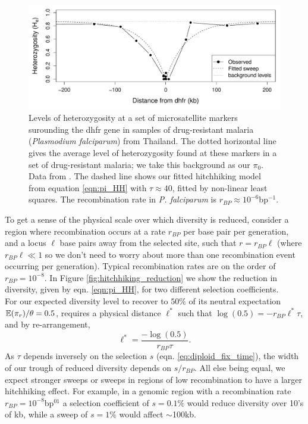 \begin{figure}
\begin{center}
\includegraphics[width=\textwidth]{Journal_figs/recom_selection/malaria_sweep/dhfr_sweep.pdf}
\end{center}
\caption{Levels of heterozygosity at a set of microsatellite markers
  surounding the dhfr gene in samples of drug-resistant malaria ({\it Plasmodium falciparum}) from
  Thailand. The dotted horizontal line gives the average level of
  heterozygosity found at these markers in a set of drug-resistant
  malaria; we take this background as our $\pi_0$. Data from \citet{nash2005selection}. The dashed line shows
  our fitted hitchhiking model from equation \ref{eqn:pi_HH} with $\tau \approx 40$, fitted by
  non-linear least squares. The recombination rate in {\it P.
    falciparum} is $r_{BP}\approx 10^{-6}$bp$^{-1}$.} \label{fig:hitchhiking_malaria}
\end{figure}


To get a sense of the physical scale over which diversity is reduced,
consider a region where recombination occurs at a rate $r_{BP}$ per
base pair per generation, and a locus $ \ell $ base pairs away from the
selected site, such that $r=r_{BP } \ell $ (where $r_{BP}  \ell  \ll 1$ so we don't need to
worry about more than one recombination event occurring per
generation). Typical
recombination rates are on the order of $r_{BP} = 10^{-8}$. In Figure
\ref{fig:hitchhiking_reduction} we show the reduction in diversity,
given by eqn. \eqref{eqn:pi_HH}, for two different selection coefficients.\\ 

For our expected diversity level to recover to $50\%$ of
its neutral expectation $\mathbb{E}(\pi_r)/\theta=0.5$, requires a physical
distance $\ell^{*}$ such that $\log(0.5) = -r_{BP} \ell ^*\tau$, and by re-arrangement,
\begin{equation}
\ell^* = \frac{-\log(0.5)}{r_{BP} \tau }.
\end{equation}
As
$\tau$ depends inversely on the selection $s$ (eqn. \eqref{eq:diploid_fix_time}), the width of our trough of reduced diversity depends on $s/r_{BP}$.
All else being equal, we expect stronger sweeps or sweeps in regions of low
recombination to have a larger hitchhiking effect. For example, in a genomic region with a recombination rate $r_{BP}=10^{-8}$bp$^{01}$ a selection coefficient of $s=0.1\%$ would reduce
diversity over 10's of kb, while a sweep of $s=1\%$ would affect
$\sim$100kb.   \\


